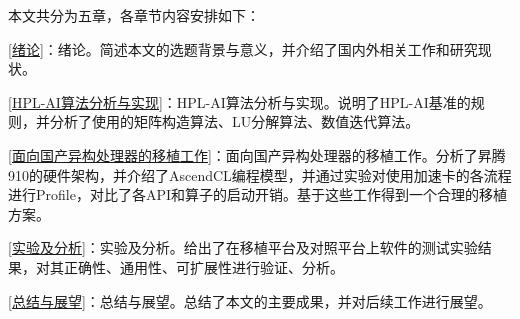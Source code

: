 本文共分为五章，各章节内容安排如下：

\autoref{绪论}：绪论。简述本文的选题背景与意义，并介绍了国内外相关工作和研究现状。

\autoref{HPL-AI算法分析与实现}：HPL-AI算法分析与实现。说明了HPL-AI基准的规则，并分析了使用的矩阵构造算法、LU分解算法、数值迭代算法。

\autoref{面向国产异构处理器的移植工作}：面向国产异构处理器的移植工作。分析了昇腾910的硬件架构，并介绍了AscendCL编程模型，并通过实验对使用加速卡的各流程进行Profile，对比了各API和算子的启动开销。基于这些工作得到一个合理的移植方案。

\autoref{实验及分析}：实验及分析。给出了在移植平台及对照平台上软件的测试实验结果，对其正确性、通用性、可扩展性进行验证、分析。

\autoref{总结与展望}：总结与展望。总结了本文的主要成果，并对后续工作进行展望。